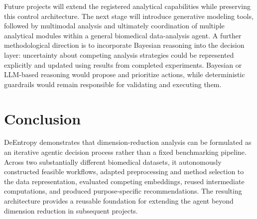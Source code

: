 \documentclass[10pt]{article}
\begin{document}
Future projects will extend the registered analytical capabilities while
preserving this control architecture. The next stage will introduce generative
modeling tools, followed by multimodal analysis and ultimately coordination of
multiple analytical modules within a general biomedical data-analysis agent.
A further methodological direction is to incorporate Bayesian reasoning into
the decision layer: uncertainty about competing analysis strategies
could be represented explicitly and updated using results from completed
experiments. Bayesian or LLM-based reasoning would propose and prioritize
actions, while deterministic guardrails would remain responsible for
validating and executing them.

\section{Conclusion}

DeEntropy demonstrates that dimension-reduction analysis can be formulated as
an iterative agentic decision process rather than a fixed benchmarking
pipeline. Across two substantially different biomedical datasets, it
autonomously constructed feasible workflows, adapted preprocessing and method
selection to the data representation, evaluated competing embeddings, reused
intermediate computations, and produced purpose-specific recommendations.
The resulting architecture provides a reusable foundation for extending the
agent beyond dimension reduction in subsequent projects.

\clearpage
\end{document}
